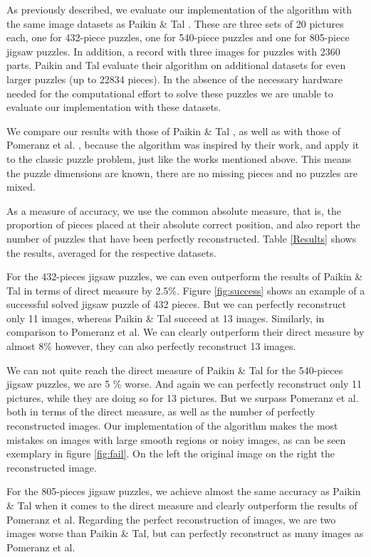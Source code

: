\documentclass[11pt]{report}
\begin{document}
As previously described, we evaluate our implementation of the algorithm with
the same image datasets as Paikin \& Tal \cite{Paikin2015}. These are three sets
of 20 pictures each, one for 432-piece puzzles, one for 540-piece puzzles and
one for 805-piece jigsaw puzzles. In addition, a record with three images for
puzzles with 2360 parts. Paikin and Tal evaluate their algorithm on additional
datasets for even larger puzzles (up to 22834 pieces). In the absence of the
necessary hardware needed for the computational effort to solve these puzzles we
are unable to evaluate our implementation with these datasets.

We compare our
results with those of Paikin \& Tal \cite{Paikin2015}, as well as with those of
Pomeranz et al. \cite{Pomeranz2011}, because the algorithm was inspired by their
work, and apply it to the classic puzzle problem, just like the works mentioned
above. This means the puzzle dimensions are known, there are no missing pieces
and no puzzles are mixed.

As a measure of accuracy, we use the common absolute measure, that is, the
proportion of pieces placed at their absolute correct position, and also report
the number of puzzles that have been perfectly reconstructed. Table
\ref{Results} shows the results, averaged for the respective datasets.

For the 432-pieces jigsaw puzzles, we can even outperform the results of Paikin \& Tal in
terms of direct measure by 2.5\%. Figure \ref{fig:success} shows an example of a
successful solved jigsaw puzzle of 432 pieces. But we can perfectly reconstruct only 11 images,
whereas Paikin \& Tal succeed at 13 images. Similarly, in comparison to Pomeranz et
al. We can clearly outperform their direct measure by almost 8\% however, they
can also perfectly reconstruct 13 images.

We can not quite reach the direct measure of Paikin \& Tal for the 540-pieces
jigsaw puzzles, we are 5 \% worse. And again we can perfectly reconstruct only 11
pictures, while they are doing so for 13 pictures. But we surpass Pomeranz et
al. both in terms of the direct measure, as well as the number of perfectly
reconstructed images. Our implementation of the algorithm makes the most
mistakes on images with large smooth regions or noisy images, as can be seen
exemplary in figure \ref{fig:fail}. On the left the original image on the right
the reconstructed image.

For the 805-pieces jigsaw puzzles, we achieve almost the same accuracy as Paikin
\& Tal when it comes to the direct measure and clearly outperform the results
of Pomeranz et al. Regarding the perfect reconstruction of images, we are two
images worse than Paikin \& Tal, but can perfectly reconstruct as many images as
Pomeranz et al.
\end{document}

